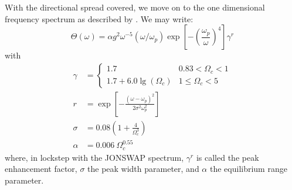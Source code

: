 With the directional spread covered, we move on to the one dimensional frequency
spectrum as described by \cite{article:Donelan1985}. We may write:
\begin{equation}
 \Theta(\omega) = 
\alpha g^2 \omega^{-5}(\omega/\omega_p) \exp\left[-\left(\frac{\omega_p}{\omega}
\right)^4\right]\gamma^r
\end{equation}
with
\begin{align*}
\gamma &= \begin{cases}
	1.7 & 0.83 < \Omega_c < 1\\
	1.7 + 6.0\lg(\Omega_c) & 1\leq\Omega_c < 5
	\end{cases}\\
r &= \exp\left[-\frac{\left(\omega -
\omega_p\right)^2}{2\sigma^2\omega_p^2}\right] \\
\sigma &= 0.08\left(1 + \frac{4}{\Omega_c^3}\right)\\
\alpha &= 0.006~\Omega_c^{0.55}
\end{align*}
where, in lockstep with the JONSWAP spectrum, 
$\gamma^r$ is called the peak enhancement factor, $\sigma$ the peak width 
parameter, and $\alpha$ the equilibrium range parameter.
%
